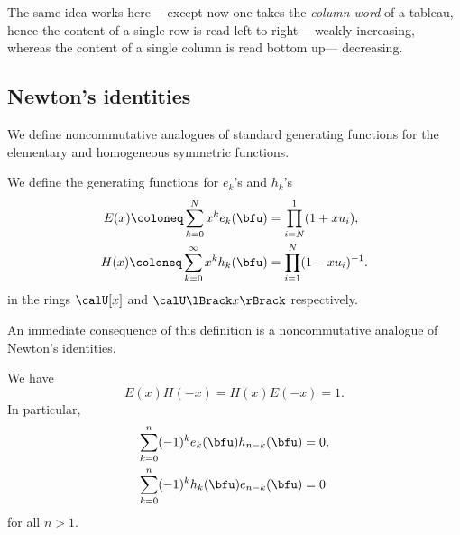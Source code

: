 \documentclass{article}
\begin{document}
The same idea works here--- except now one takes the \textit{column word} of a tableau, hence the content of a single row is read left to right--- weakly increasing, whereas the content of a single column is read bottom up--- decreasing.

\subsection{
    Newton's identities
}

We define noncommutative analogues of standard generating functions for the elementary and homogeneous symmetric functions.

\begin{definition}
    \label{def:rowcolGenFuncs}
    We define the generating functions for $e_k$'s and $h_k$'s
    \begin{align}
        \label{eqn:colGenFunc}
        E(x)
        \coloneq
        \sum_{k=0}^N
        x^k e_k(\bfu)
        &=
        \prod_{i=N}^1
        (1+xu_i),
        \\
        \label{eqn:rowGenFunc}
        H(x)
        \coloneq
        \sum_{k=0}^\infty
        x^k h_k(\bfu)
        &=
        \prod_{i=1}^N
        (1-xu_i)^{-1}.
    \end{align}
    in the rings $\calU[x]$ and $\calU\lBrack x \rBrack$ respectively.
\end{definition}

An immediate consequence of this definition is a noncommutative analogue of Newton's identities.

\begin{proposition}
    We have
    \begin{equation}
        \label{eqn:ncNewtonGirardFPS}
        E(x)H(-x) = H(x)E(-x) = 1.
    \end{equation}
    In particular,
    \begin{align}
        \label{eqn:ncNewtonGirard1}
        \sum_{k=0}^n (-1)^ke_k(\bfu)h_{n-k}(\bfu) 
        &= 
        0, \\
        \label{eqn:ncNewtonGirard2}
        \sum_{k=0}^n (-1)^kh_k(\bfu)e_{n-k}(\bfu) 
        &= 
        0
    \end{align}
    for all $n > 1$.
\end{proposition}
\end{document}
